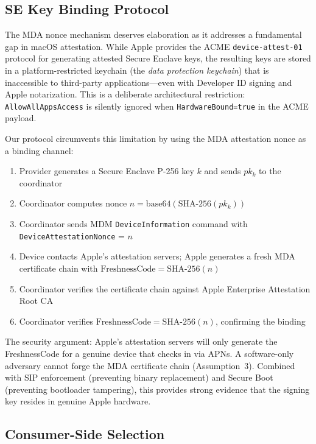 \documentclass[10pt,twocolumn,letterpaper]{article}
\begin{document}
\subsection{SE Key Binding Protocol}

The MDA nonce mechanism deserves elaboration as it addresses a fundamental gap in macOS attestation. While Apple provides the ACME \texttt{device-attest-01} protocol for generating attested Secure Enclave keys, the resulting keys are stored in a platform-restricted keychain (the \emph{data protection keychain}) that is inaccessible to third-party applications---even with Developer ID signing and Apple notarization. This is a deliberate architectural restriction: \texttt{AllowAllAppsAccess} is silently ignored when \texttt{HardwareBound=true} in the ACME payload.

Our protocol circumvents this limitation by using the MDA attestation nonce as a binding channel:

\begin{enumerate}[leftmargin=*,itemsep=1pt]
    \item Provider generates a Secure Enclave P-256 key $k$ and sends $pk_k$ to the coordinator
    \item Coordinator computes nonce $n = \text{base64}(\text{SHA-256}(pk_k))$
    \item Coordinator sends MDM \texttt{DeviceInformation} command with \texttt{DeviceAttestationNonce} = $n$
    \item Device contacts Apple's attestation servers; Apple generates a fresh MDA certificate chain with $\text{FreshnessCode} = \text{SHA-256}(n)$
    \item Coordinator verifies the certificate chain against Apple Enterprise Attestation Root CA
    \item Coordinator verifies $\text{FreshnessCode} = \text{SHA-256}(n)$, confirming the binding
\end{enumerate}

The security argument: Apple's attestation servers will only generate the FreshnessCode for a genuine device that checks in via APNs. A software-only adversary cannot forge the MDA certificate chain (Assumption~3). Combined with SIP enforcement (preventing binary replacement) and Secure Boot (preventing bootloader tampering), this provides strong evidence that the signing key resides in genuine Apple hardware.

\subsection{Consumer-Side Selection}
\end{document}
